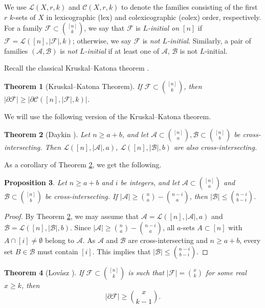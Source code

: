 \documentclass[11pt]{article}
\newcommand{\m}{\mathcal}
\newtheorem{theorem}{Theorem}[section]
\newtheorem{proposition}[theorem]{Proposition}
\begin{document}
We use $\mathcal{L}(X,r,k)$ and $\mathcal{C}(X,r,k)$ to denote the families consisting of the first $r$ $k$-sets of $X$ in lexicographic (lex) and colexicographic (colex) order, respectively. For a family $\mathcal{F} \subset \binom{[n]}{k}$, we say that $\mathcal{F}$ is \textit{$L$-initial on $[n]$} if $\mathcal{F} = \mathcal{L}([n], |\mathcal{F}|, k)$; otherwise, we say $\mathcal{F}$ is \textit{not $L$-initial}. Similarly, a pair of families $(\mathcal{A}, \mathcal{B})$ is \textit{not $L$-initial} if at least one of $\mathcal{A}$,  $\mathcal{B}$ is not $L$-initial.

Recall  the classical Kruskal--Katona theorem \cite{12-1-2, 12-1-3}. 
\begin{theorem}[Kruskal--Katona Theorem]
If $\mathcal{F}\subset {[n]\choose k}$, then $|\partial \mathcal{F}|\ge|\partial \mathcal{C}([n], |\mathcal{F}|,k)|$. 
\end{theorem}

We will use the following version of the Kruskal--Katona theorem. 


\begin{theorem}[Daykin \cite{12-1-4}]\label{12-1-1}
Let $n\ge a+b$, and let $\mathcal{A}\subset {[n]\choose a},\mathcal{B}\subset {[n]\choose b}$ be cross-intersecting. Then $\mathcal{L}([n], |\mathcal{A}|,a)$, $\mathcal{L}([n], |\mathcal{B}|,b)$ are also cross-intersecting.
\end{theorem}

As a corollary of Theorem \ref{12-1-1}, we get the following.

\begin{proposition}\label{1-4-1}
Let $n\ge a+b$ and $i$ be integers, and let $\m A \subset {[n]\choose a}$ and $\m B \subset {[n]\choose b}$ be cross-intersecting. If $|\m A|\ge {n\choose a}-{n-i\choose a}$, then $|\m B|\le {n-i\choose b-i}$.
\end{proposition}
\begin{proof}
By Theorem \ref{12-1-1}, we may assume that $\m A=\m L([n], |\m A|, a)$ and $\m B=\m L([n], |\m B|, b)$. Since $|\m A|\ge {n\choose a}-{n-i\choose a}$, all $a$-sets $A\subset [n]$ with $A\cap [i]\ne \emptyset$ belong to $\m A$. 
As $\m A$ and $\m B$ are cross-intersecting and $n\ge a+b$,  every set $B\in \m B$ must contain $[i]$. This implies that $|\m B|\le {n-i\choose b-i}$.
\end{proof}


\begin{theorem}[Lov\'{a}sz \cite{12-2-3}]\label{12-2-2}
If $\mathcal{F}\subset {[n]\choose k}$ is such that  $|\mathcal{F}|={x\choose k}$ for some real $x\ge k$, then 
$$|\partial \mathcal{F}|\ge {x \choose k-1}. $$
\end{theorem}
\end{document}

